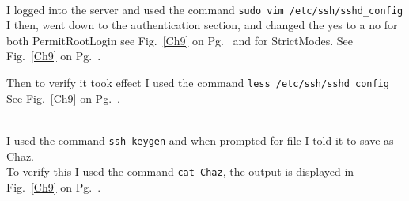 \documentclass[../CIT217_RHEL124_LabJournal.tex]{subfiles}
\begin{document}
\noindent{}
\\I logged into the server and used the command
{\scriptsize{\verb$sudo vim /etc/ssh/sshd_config$}\normalsize}
\\I then, went down to the authentication section, and changed the yes to a no
for both PermitRootLogin see Fig.~\ref{Ch9} on
Pg.~\pageref{Ch9} and for StrictModes. See Fig.~\ref{Ch9} on
Pg.~\pageref{Ch9}.
\hfill\break

\noindent Then to verify it took effect I used the command 
{\scriptsize{\verb$less /etc/ssh/sshd_config$}\normalsize} 
See Fig.~\ref{Ch9} on
Pg.~\pageref{Ch9}.
\hfill\break

\noindent{}
\\I used the command {\scriptsize{\verb$ssh-keygen$}\normalsize} and
when prompted for file I told it to save as Chaz.
\\To verify this I used the command {\scriptsize{\verb$cat Chaz$}\normalsize},
the output is displayed in Fig.~\ref{Ch9} on
Pg.~\pageref{Ch9}.
\end{document}
